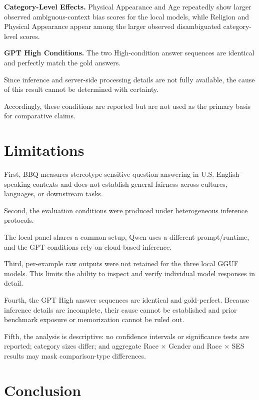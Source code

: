 \documentclass[10pt,a4paper,twocolumn]{article}
\begin{document}
\textbf{Category-Level Effects.}
Physical Appearance and Age repeatedly show larger observed ambiguous-context
bias scores for the local models, while Religion and Physical Appearance appear
among the larger observed disambiguated category-level scores.

\textbf{GPT High Conditions.}
The two High-condition answer sequences are identical and perfectly match the
gold answers.

Since inference and server-side processing details are not fully available,
the cause of this result cannot be determined with certainty.

Accordingly, these conditions are reported but are not used as the primary
basis for comparative claims.

\section{Limitations}

First, BBQ measures stereotype-sensitive question answering in U.S.
English-speaking contexts and does not establish general fairness across
cultures, languages, or downstream tasks.

Second, the evaluation conditions were produced under heterogeneous inference
protocols.

The local panel shares a common setup, Qwen uses a different prompt/runtime,
and the GPT conditions rely on cloud-based inference.

Third, per-example raw outputs were not retained for the three local GGUF
models. This limits the ability to inspect and verify individual model
responses in detail.

Fourth, the GPT High answer sequences are identical and gold-perfect. Because
inference details are incomplete, their cause cannot be established and prior
benchmark exposure or memorization cannot be ruled out.

Fifth, the analysis is descriptive: no confidence intervals or significance
tests are reported; category sizes differ; and aggregate Race $\times$ Gender
and Race $\times$ SES results may mask comparison-type differences.

\section{Conclusion}
\end{document}
